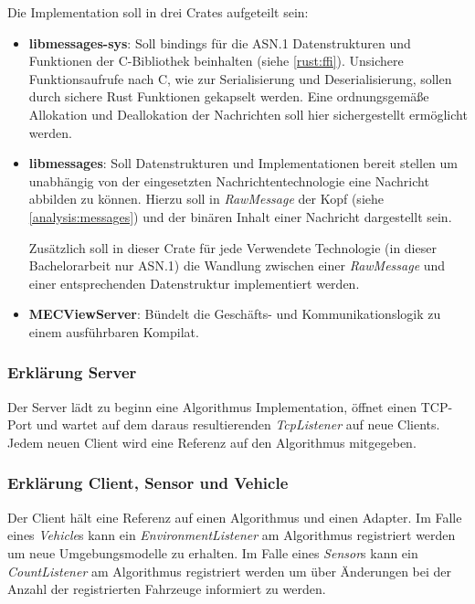 \documentclass[
	12pt,
	table,
	bigheadings,
	ngerman,
	a4paper,
	BCOR5mm,
	DIV14,
	1.1headlines,
	pagesize,
	oneside,
	openright,
	titlepage,
	headsepline,
	nochapterprefix,
	bibtotoc,
	tocindent,
	listsindent,
	pointlessnumbers,
	cleardoubleempty,
	fleqn,
	halfparskip
]{scrbook}
\begin{document}
		Die Implementation soll in drei Crates aufgeteilt sein:
		\begin{itemize}
			\item \textbf{libmessages-sys}: Soll bindings für die ASN.1 Datenstrukturen und Funktionen der C-Bibliothek beinhalten (siehe \autoref{rust:ffi}).
			Unsichere Funktionsaufrufe nach C, wie zur Serialisierung und Deserialisierung, sollen durch sichere Rust Funktionen gekapselt werden.
			Eine ordnungsgemäße Allokation und Deallokation der Nachrichten soll hier sichergestellt ermöglicht werden.
			
			\item \textbf{libmessages}: Soll Datenstrukturen und Implementationen bereit stellen um unabhängig von der eingesetzten Nachrichtentechnologie eine Nachricht abbilden zu können.
			Hierzu soll in \textit{RawMessage} der Kopf (siehe \autoref{analysis:messages}) und der binären Inhalt einer Nachricht dargestellt sein.
			
			Zusätzlich soll in dieser Crate für jede Verwendete Technologie (in dieser Bachelorarbeit nur ASN.1) die Wandlung zwischen einer \textit{RawMessage} und einer entsprechenden Datenstruktur implementiert werden.
			
			\item \textbf{MECViewServer}: Bündelt die Geschäfts- und Kommunikationslogik zu einem ausführbaren Kompilat.
		\end{itemize}
		
		\subsubsection{Erklärung Server}
		
		Der Server lädt zu beginn eine Algorithmus Implementation, öffnet einen TCP-Port und wartet auf dem daraus resultierenden \textit{TcpListener} auf neue Clients.
		Jedem neuen Client wird eine Referenz auf den Algorithmus mitgegeben.
		
		\subsubsection{Erklärung Client, Sensor und Vehicle}
		
		Der Client hält eine Referenz auf einen Algorithmus und einen Adapter.
		Im Falle eines \textit{Vehicle}s kann ein \textit{EnvironmentListener} am Algorithmus registriert werden um neue Umgebungsmodelle zu erhalten.
		Im Falle eines \textit{Sensor}s kann ein \textit{CountListener} am Algorithmus registriert werden um über Änderungen bei der Anzahl der registrierten Fahrzeuge informiert zu werden.
		
\end{document}
